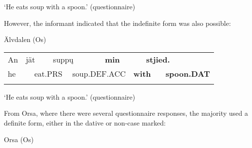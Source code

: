 \begin{styleTranslation}
‘He eats soup with a spoon.’ (questionnaire)

\end{styleTranslation}

However, the informant indicated that the indefinite form was also possible:

\begin{listWWNumileveli}
\item {}

\begin{styleExample}
Älvdalen (Os)

\end{styleExample}

\end{listWWNumileveli}

\begin{tabular}{llllllllll}
\lsptoprule
An & \multicolumn{2}{l}{jät

} & \multicolumn{2}{l}{supp\k{u}

} & \multicolumn{2}{l}{{\bfseries min}

} & \multicolumn{2}{l}{{\bfseries stjied.}

} & \\
\multicolumn{2}{l}{he

} & \multicolumn{2}{l}{eat.PRS

} & \multicolumn{2}{l}{soup.DEF.ACC

} & \multicolumn{2}{l}{{\bfseries with}

} & \multicolumn{2}{l}{{\bfseries spoon.DAT}

}\\
\lspbottomrule
\end{tabular}

\begin{styleTranslation}
‘He eats soup with a spoon.’ (questionnaire)

\end{styleTranslation}

From Orsa, where there were several questionnaire responses, the majority used a definite form, either in the dative or non-case marked:

\begin{listWWNumileveli}
\item {}

\begin{styleExample}
Orsa (Os)

\end{styleExample}

\end{listWWNumileveli}

